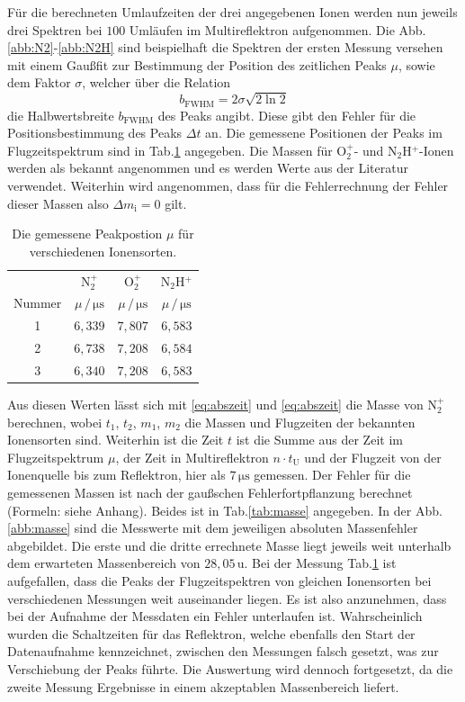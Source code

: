 \documentclass[numbers=noenddot,a4paper,notitlepage,twoside,BCOR15mm]{scrartcl}
\begin{document}
	Für die berechneten Umlaufzeiten der drei angegebenen Ionen werden nun jeweils drei Spektren bei $100$ Umläufen im Multireflektron aufgenommen. Die Abb.\ref{abb:N2}-\ref{abb:N2H} sind beispielhaft die Spektren der ersten Messung versehen mit einem Gaußfit zur Bestimmung der Position des zeitlichen Peaks $\mu$, sowie dem Faktor $\sigma$, welcher über die Relation
	\begin{equation}
	b_\mathrm{FWHM} = 2 \sigma\sqrt{2 \ln 2}
	\end{equation}
	die Halbwertsbreite $b_\mathrm{FWHM}$ des Peaks angibt. Diese gibt den Fehler für die Positionsbestimmung des Peaks $\Delta t$ an. Die gemessene Positionen der Peaks im Flugzeitspektrum sind in Tab.\ref{tab:zeit} angegeben. Die Massen für O${}_2^+$- und N${}_2$H$^+$-Ionen werden als bekannt angenommen und es werden Werte aus der Literatur verwendet. Weiterhin wird angenommen, dass für die Fehlerrechnung der Fehler dieser Massen also $\Delta m_\mathrm{i} = 0$ gilt.
	\begin{table}[t]
		\centering
		\caption{Die gemessene Peakpostion $\mu$ für verschiedenen Ionensorten.}
		\begin{tabular}{c|c c c} 
			& N$_2^+$ & O$_2^+$ & N$_2$H$^+$ \\
			Nummer & $\mu\,/\,\mathrm{\mu s}$ & $\mu\,/\,\mathrm{\mu s}$ & $\mu\,/\,\mathrm{\mu s}$ \\ \hline
			1 & $6,339$ & $7,807$ & $6,583$ \\
			2 & $6,738$ & $7,208$ & $6,584$ \\
			3 & $6,340$ & $7,208$ & $6,583$ 
		\end{tabular}
		\label{tab:zeit}
	\end{table}
	Aus diesen Werten lässt sich mit \eqref{eq:abszeit} und \eqref{eq:abszeit} die Masse von N$_2^+$ berechnen, wobei $t_1$, $t_2$, $m_1$, $m_2$ die Massen und Flugzeiten der bekannten Ionensorten sind. Weiterhin ist die Zeit $t$ ist die Summe aus der Zeit im Flugzeitspektrum $\mu$, der Zeit in Multireflektron $n\cdot t_\mathrm{U}$ und der Flugzeit von der Ionenquelle bis zum Reflektron, hier als $7\,\mathrm{\mu s}$ gemessen. Der Fehler für die gemessenen Massen ist nach der gaußschen Fehlerfortpflanzung berechnet (Formeln: siehe Anhang). Beides ist in Tab.\ref{tab:masse} angegeben. In der Abb.\ref{abb:masse} sind die Messwerte mit dem jeweiligen absoluten Massenfehler abgebildet. Die erste und die dritte errechnete Masse liegt jeweils weit unterhalb dem erwarteten Massenbereich von $28,05\,\mathrm{u}$. Bei der Messung Tab.\ref{tab:zeit} ist aufgefallen, dass die Peaks der Flugzeitspektren von gleichen Ionensorten bei verschiedenen Messungen weit auseinander liegen. Es ist also anzunehmen, dass bei der Aufnahme der Messdaten ein Fehler unterlaufen ist. Wahrscheinlich wurden die Schaltzeiten für das Reflektron, welche ebenfalls den Start der Datenaufnahme kennzeichnet, zwischen den Messungen falsch gesetzt, was zur Verschiebung der Peaks führte. Die Auswertung wird dennoch fortgesetzt, da die zweite Messung Ergebnisse in einem akzeptablen Massenbereich liefert.
\end{document}

